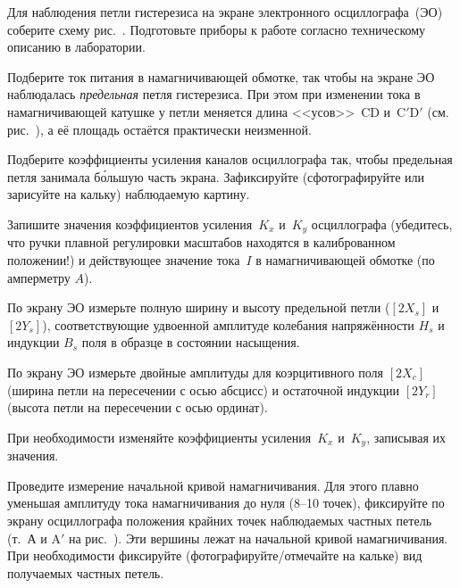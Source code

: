 \begin{lab:task}



\item
Для наблюдения петли гистерезиса на экране электронного осциллографа~(ЭО)
соберите схему рис.~. 
Подготовьте приборы к работе согласно техническому описанию в лаборатории.

\item \label{p45-1}
Подберите ток питания в намагничивающей обмотке, так чтобы на экране ЭО
наблюдалась \emph{предельная} петля гистерезиса. При этом 
при изменении тока в намагничивающей катушке 
у петли меняется длина <<усов>>~CD 
и~C$'$D$'$ (см. рис.~), а её площадь остаётся
практически неизменной.

\item Подберите коэффициенты усиления каналов осциллографа так, 
чтобы предельная петля занимала б\'{о}льшую часть экрана.
Зафиксируйте (сфотографируйте или зарисуйте на кальку)
наблюдаемую картину.

Запишите значения коэффициентов усиления~$K_x$ и~$K_y$ осциллографа 
(убедитесь, что ручки плавной регулировки масштабов находятся
в калиброванном положении!) и действующее значение тока~$I$ 
в намагничивающей обмотке (по амперметру $A$).

\item \label{p45-2} По экрану ЭО измерьте полную ширину и высоту
предельной петли ($[2X_{s}]$ и $[2Y_{s}]$),
соответствующие удвоенной амплитуде колебания 
напряжённости $H_s$ и индукции $B_s$ поля в образце в состоянии насыщения.

\item \label{p45-3} По экрану ЭО измерьте двойные амплитуды 
для коэрцитивного поля $[2X_c]$ (ширина петли на пересечении с осью абсцисс) и
остаточной индукции $[2Y_r]$ (высота петли на пересечении с осью ординат).

При необходимости изменяйте коэффициенты усиления~$K_x$ и~$K_y$,
записывая их значения.

\item 
Проведите измерение начальной кривой намагничивания. 
Для этого плавно уменьшая амплитуду тока
намагничивания до нуля (8--10 точек), фиксируйте
по экрану осциллографа положения крайних точек наблюдаемых частных петель
(т.~А и A$'$ на рис.~).
Эти вершины лежат на начальной кривой намагничи­вания.
При необходимости фиксируйте (фотографируйте/отмечайте на кальке)
вид получаемых частных петель.


\end{lab:task}
